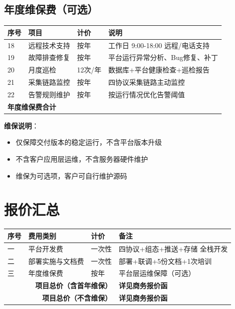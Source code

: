 \documentclass[12pt,a4paper]{ctexart}
\begin{document}
\subsection{年度维保费（可选）}

\begin{longtable}{p{1.2cm}p{4cm}p{2.5cm}p{5.5cm}}
\toprule\textbf{序号} & \textbf{项目} & \textbf{计价} & \textbf{说明} \\
\midrule
18 & 远程技术支持 & 按年 & 工作日 9:00-18:00 远程/电话支持 \\
19 & 故障排查修复 & 按年 & 平台运行异常分析、Bug修复、补丁 \\
20 & 月度巡检 & 12次/年 & 数据库+平台健康检查+巡检报告 \\
21 & 采集链路监控 & 按年 & 四协议采集链路主动监控 \\
22 & 告警规则维护 & 按年 & 按运行情况优化告警阈值 \\
\hline
\multicolumn{4}{l}{\textbf{年度维保费合计}} \\
\bottomrule
\end{longtable}

\textbf{维保说明}：
\begin{itemize}
  \item 仅保障交付版本的稳定运行，不含平台版本升级
  \item 不含客户应用层运维，不含服务器硬件维护
  \item 维保为可选项，客户可自行维护源码
\end{itemize}

\section{报价汇总}

\begin{table}[H]\centering
\begin{tabular}{p{1.2cm}p{5cm}p{2.5cm}p{4cm}}
\toprule\textbf{序号} & \textbf{费用类别} & \textbf{计价} & \textbf{备注} \\
\midrule
一 & 平台开发费 & 一次性 & 四协议+组态+推送+存储 全栈开发 \\
二 & 部署实施与文档费 & 一次性 & 部署+联调+5份文档+1次培训 \\
三 & 年度维保费 & 按年 & 平台层运维保障（可选） \\
\hline
\multicolumn{3}{r}{\textbf{项目总价（含首年维保）}} & \textbf{详见商务报价函} \\
\multicolumn{3}{r}{\textbf{项目总价（不含维保）}}   & \textbf{详见商务报价函} \\
\bottomrule
\end{tabular}
\end{table}
\end{document}
